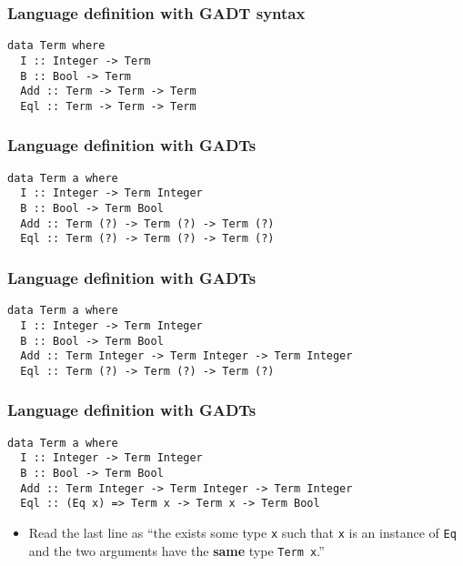 \documentclass[pdftex,aspectratio=169]{beamer}
\begin{document}
\begin{frame}[fragile]
  \frametitle{Language definition with GADT syntax}
  \begin{block}{}
    \begin{lstlisting}
data Term where
  I :: Integer -> Term
  B :: Bool -> Term
  Add :: Term -> Term -> Term
  Eql :: Term -> Term -> Term   
    \end{lstlisting}
  \end{block}
\end{frame}

\begin{frame}[fragile]
  \frametitle{Language definition with GADTs}
  \begin{block}{}
    \begin{lstlisting}
data Term a where
  I :: Integer -> Term Integer
  B :: Bool -> Term Bool
  Add :: Term (?) -> Term (?) -> Term (?)
  Eql :: Term (?) -> Term (?) -> Term (?)
    \end{lstlisting}
  \end{block}
\end{frame}

\begin{frame}[fragile]
  \frametitle{Language definition with GADTs}
  \begin{block}{}
    \begin{lstlisting}
data Term a where
  I :: Integer -> Term Integer
  B :: Bool -> Term Bool
  Add :: Term Integer -> Term Integer -> Term Integer
  Eql :: Term (?) -> Term (?) -> Term (?)
    \end{lstlisting}
  \end{block}
\end{frame}

\begin{frame}[fragile]
  \frametitle{Language definition with GADTs}
  \begin{block}{}
    \begin{lstlisting}
data Term a where
  I :: Integer -> Term Integer
  B :: Bool -> Term Bool
  Add :: Term Integer -> Term Integer -> Term Integer
  Eql :: (Eq x) => Term x -> Term x -> Term Bool
    \end{lstlisting}
  \end{block}
  \begin{itemize}
  \item Read the last line as ``the exists some type \lstinline{x}
    such that \lstinline{x} is an instance of \lstinline{Eq} and the
    two arguments have the \textbf{same} type \lstinline{Term x}.''
  \end{itemize}
\end{frame}
\end{document}
